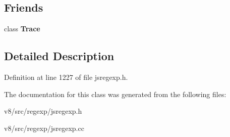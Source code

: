 \subsection*{Friends}
\begin{DoxyCompactItemize}
\item 
\mbox{\label{classv8_1_1internal_1_1Trace_1_1DeferredAction_a9a7aa541dbcfdac34b25b49217ec39d7}} 
class {\bfseries Trace}
\end{DoxyCompactItemize}


\subsection{Detailed Description}


Definition at line 1227 of file jsregexp.\+h.



The documentation for this class was generated from the following files\+:\begin{DoxyCompactItemize}
\item 
v8/src/regexp/jsregexp.\+h\item 
v8/src/regexp/jsregexp.\+cc\end{DoxyCompactItemize}

